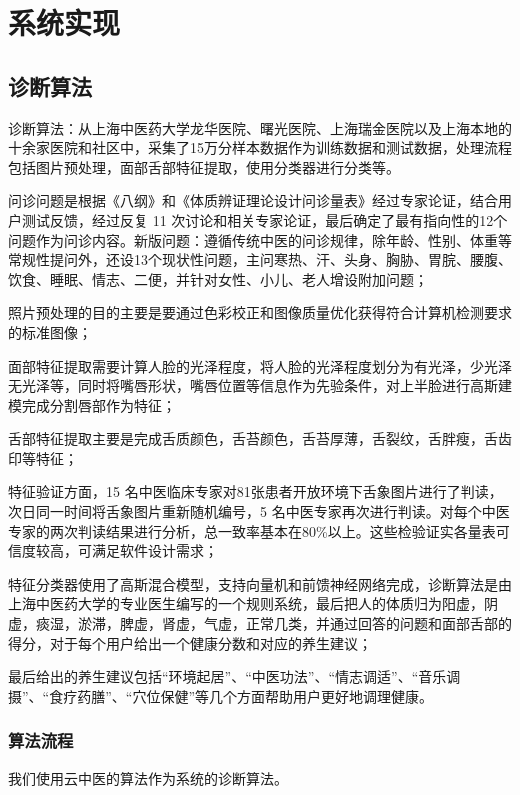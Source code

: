 \chapter{系统实现}

\section{诊断算法}
诊断算法：从上海中医药大学龙华医院、曙光医院、上海瑞金医院以及上海本地的十余家医院和社区中，采集了15万分样本数据作为训练数据和测试数据，处理流程包括图片预处理，面部舌部特征提取，使用分类器进行分类等。

问诊问题是根据《八纲》和《体质辨证理论设计问诊量表》经过专家论证，结合用户测试反馈，经过反复 11 次讨论和相关专家论证，最后确定了最有指向性的12个问题作为问诊内容。新版问题：遵循传统中医的问诊规律，除年龄、性别、体重等常规性提问外，还设13个现状性问题，主问寒热、汗、头身、胸胁、胃脘、腰腹、饮食、睡眠、情志、二便，并针对女性、小儿、老人增设附加问题；

照片预处理的目的主要是要通过色彩校正和图像质量优化获得符合计算机检测要求的标准图像；

面部特征提取需要计算人脸的光泽程度，将人脸的光泽程度划分为有光泽，少光泽无光泽等，同时将嘴唇形状，嘴唇位置等信息作为先验条件，对上半脸进行高斯建模完成分割唇部作为特征；

舌部特征提取主要是完成舌质颜色，舌苔颜色，舌苔厚薄，舌裂纹，舌胖瘦，舌齿印等特征；

特征验证方面，15 名中医临床专家对81张患者开放环境下舌象图片进行了判读，次日同一时间将舌象图片重新随机编号，5 名中医专家再次进行判读。对每个中医专家的两次判读结果进行分析，总一致率基本在80\%以上。这些检验证实各量表可信度较高，可满足软件设计需求；

特征分类器使用了高斯混合模型，支持向量机和前馈神经网络完成，诊断算法是由上海中医药大学的专业医生编写的一个规则系统，最后把人的体质归为阳虚，阴虚，痰湿，淤滞，脾虚，肾虚，气虚，正常几类，并通过回答的问题和面部舌部的得分，对于每个用户给出一个健康分数和对应的养生建议；

最后给出的养生建议包括“环境起居”、“中医功法”、“情志调适”、“音乐调摄”、“食疗药膳”、“穴位保健”等几个方面帮助用户更好地调理健康。

\subsection{算法流程}
我们使用云中医的算法作为系统的诊断算法。

